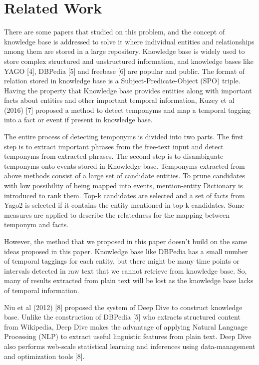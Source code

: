\documentclass[12pt,a4paper]{article}
\begin{document}
\section{Related Work}
There are some papers that studied on this problem, and the concept of knowledge base is addressed to solve it where individual entities and relationships among them are stored in a large repository. Knowledge base is widely used to store complex structured and unstructured information, and knowledge bases like YAGO [4], DBPedia [5] and freebase [6] are popular and public. The format of relation stored in knowledge base is a Subject-Predicate-Object (SPO) triple. Having the property that Knowledge base provides entities along with important facts about entities and other important temporal information,  Kuzey et al (2016) [7] proposed a method to detect temponyms and map a temporal tagging into a fact or event if present in knowledge base.

The entire process of detecting temponyms is divided into two parts. The first step is to extract important phrases from the free-text input and detect temponyms from extracted phrases. The second step is to disambiguate temponyms onto events stored in Knowledge base. Temponyms extracted from above methods consist of a large set of candidate entities. To prune candidates with low possibility of being mapped into events, mention-entity Dictionary is introduced to rank them. Top-k candidates are selected and a set of facts from Yago2 is selected if it contains the entity mentioned in top-k candidates. Some measures are applied to describe the relatedness for the mapping between temponym and facts. 

However, the method that we proposed in this paper doesn’t build on the same ideas proposed in this paper. Knowledge base like DBPedia has a small number of temporal taggings for each entity, but there might be many time points or intervals detected in raw text that we cannot retrieve from knowledge base. So, many of results extracted from plain text will be lost as the knowledge base lacks of temporal information.

Niu et al (2012) [8] proposed the system of Deep Dive to construct knowledge base. Unlike the construction of DBPedia [5] who extracts structured content from Wikipedia, Deep Dive makes the advantage of applying Natural Language Processing (NLP) to extract useful linguistic features from plain text. Deep Dive also performs web-scale statistical learning and inferences using data-management and optimization tools [8].
\end{document}

